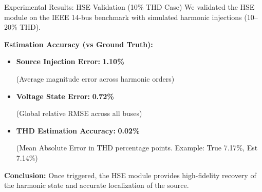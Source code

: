 \documentclass[aspectratio=169]{beamer}
\begin{document}
\begin{frame}{Experimental Results: HSE Validation (10\% THD Case)}
    We validated the HSE module on the IEEE 14-bus benchmark with simulated harmonic injections (10--20\% THD).
    
    \vspace{0.5em}
    \textbf{Estimation Accuracy (vs Ground Truth):}
    \begin{itemize}
      \setlength\itemsep{0.3em}
      \item \textbf{Source Injection Error:} \textcolor{green!40!black}{\textbf{1.10\%}} 
      \par {\footnotesize (Average magnitude error across harmonic orders)}
      
      \item \textbf{Voltage State Error:} \textcolor{green!40!black}{\textbf{0.72\%}}
      \par {\footnotesize (Global relative RMSE across all buses)}
      
      \item \textbf{THD Estimation Accuracy:} \textcolor{green!40!black}{\textbf{0.02\%}}
      \par {\footnotesize (Mean Absolute Error in THD percentage points. Example: True 7.17\%, Est 7.14\%)}
    \end{itemize}
    
    \vspace{0.6em}
    \textbf{Conclusion:} Once triggered, the HSE module provides high-fidelity recovery of the harmonic state and accurate localization of the source.
\end{frame}
\end{document}
